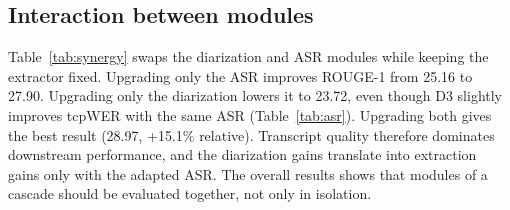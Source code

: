 \documentclass{article}
\begin{document}

\subsection{Interaction between modules}
\label{ssec:res-synergy}


Table~\ref{tab:synergy} swaps the diarization and ASR modules while keeping the extractor fixed.
Upgrading only the ASR improves ROUGE-1 from 25.16 to 27.90.
Upgrading only the diarization lowers it to 23.72, even though D3 slightly improves tcpWER with the same ASR (Table~\ref{tab:asr}).
Upgrading both gives the best result (28.97, +15.1\% relative).
Transcript quality therefore dominates downstream performance, and the diarization gains translate into extraction gains only with the adapted ASR.
The overall results shows that modules of a cascade should be evaluated together, not only in isolation.
\end{document}
